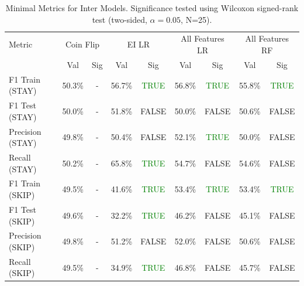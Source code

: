 \begin{table}[ht]
\centering
\begin{tabular}{lcccccccc}
\hline
Metric & \multicolumn{2}{c}{Coin Flip} & \multicolumn{2}{c}{EI LR} & \multicolumn{2}{c}{All Features LR} & \multicolumn{2}{c}{All Features RF} \\
 & Val & Sig & Val & Sig & Val & Sig & Val & Sig \\
\hline
F1 Train (STAY) & 50.3\% & - & 56.7\% & \textcolor{green}{TRUE} & 56.8\% & \textcolor{green}{TRUE} & 55.8\% & \textcolor{green}{TRUE} \\
F1 Test (STAY) & 50.0\% & - & 51.8\% & FALSE & 50.0\% & FALSE & 50.6\% & FALSE \\
Precision (STAY) & 49.8\% & - & 50.4\% & FALSE & 52.1\% & \textcolor{green}{TRUE} & 50.0\% & FALSE \\
Recall (STAY) & 50.2\% & - & 65.8\% & \textcolor{green}{TRUE} & 54.7\% & FALSE & 54.6\% & FALSE \\
F1 Train (SKIP) & 49.5\% & - & 41.6\% & \textcolor{green}{TRUE} & 53.4\% & \textcolor{green}{TRUE} & 53.4\% & \textcolor{green}{TRUE} \\
F1 Test (SKIP) & 49.6\% & - & 32.2\% & \textcolor{green}{TRUE} & 46.2\% & FALSE & 45.1\% & FALSE \\
Precision (SKIP) & 49.8\% & - & 51.2\% & FALSE & 52.0\% & FALSE & 50.6\% & FALSE \\
Recall (SKIP) & 49.5\% & - & 34.9\% & \textcolor{green}{TRUE} & 46.8\% & FALSE & 45.7\% & FALSE \\
\hline
\end{tabular}
\caption{Minimal Metrics for Inter Models. Significance tested using Wilcoxon signed-rank test (two-sided, $\alpha=0.05$, N=25).}
\label{tab:metrics_inter}
\end{table}